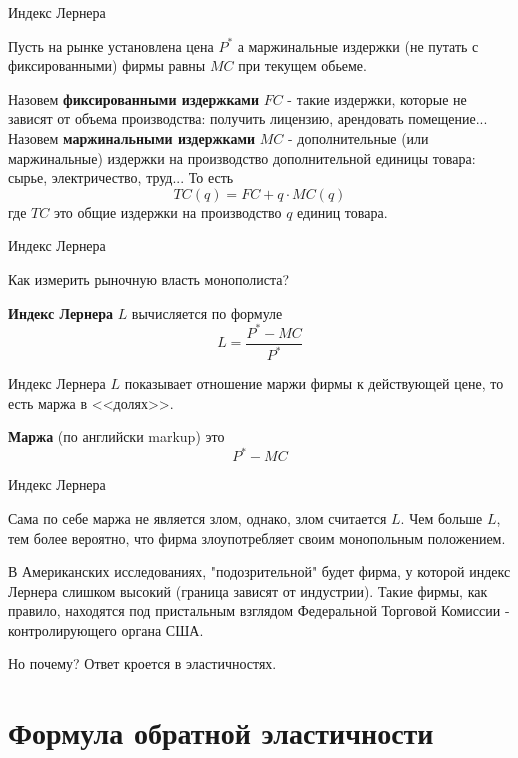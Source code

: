 \documentclass{beamer}
\begin{document}
\begin{frame}{Индекс Лернера}

Пусть на рынке установлена цена $P^{\ast}$ а маржинальные издержки (не путать с фиксированными) фирмы равны $MC$ при текущем обьеме.

Назовем \textbf{фиксированными издержками} $FC$ - такие издержки, которые не зависят от объема производства: получить лицензию, арендовать помещение... Назовем \textbf{маржинальными издержками} $MC$ - дополнительные (или маржинальные) издержки на производство дополнительной единицы товара: сырье, электричество, труд... То есть
$$ TC(q) = FC + q \cdot MC(q)$$
где $TC$ это общие издержки на производство $q$ единиц товара.
\end{frame}

\begin{frame}{Индекс Лернера}

Как измерить рыночную власть монополиста?

\begin{definition}
\textbf{Индекс Лернера} $L$ вычисляется по формуле
$$L = \frac{P^{\ast}-MC}{P^{\ast}}$$
\end{definition}
Индекс Лернера $L$ показывает отношение маржи фирмы к действующей цене, то есть маржа в <<долях>>.

\begin{definition}
\textbf{Маржа} (по английски markup) это 
$$P^{\ast}-MC$$
\end{definition}

\end{frame}

\begin{frame}{Индекс Лернера}

Сама по себе маржа не является злом, однако, злом считается $L$. Чем больше $L$, тем более вероятно, что фирма злоупотребляет своим монопольным положением.

В Американских исследованиях, "подозрительной" будет фирма, у которой индекс Лернера слишком высокий (граница зависят от индустрии). Такие фирмы, как правило, находятся под пристальным взглядом Федеральной Торговой Комиссии - контролирующего органа США. 

Но почему? Ответ кроется в эластичностях.

\end{frame}

\section{Формула обратной эластичности}
\end{document}
